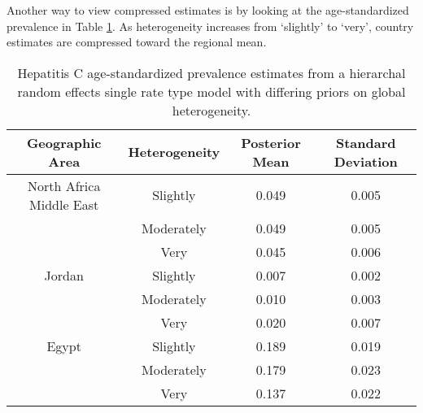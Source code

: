 Another way to view compressed estimates is by looking at the age-standardized prevalence in Table \ref{tab:app-hepc global rfx}.  As heterogeneity increases from `slightly' to `very', country estimates are compressed toward the regional mean.

    \begin{table}[h]
        \begin{center}
        \caption{ Hepatitis C age-standardized prevalence estimates from a hierarchal random effects single rate type model with differing priors on global heterogeneity.}
        \label{tab:app-hepc global rfx}
        \begin{tabular}{|c|c|c|c|}
            \hline
                Geographic Area & Heterogeneity & Posterior Mean & Standard Deviation \\
            \hline
                North Africa Middle East & Slightly & 0.049 & 0.005 \\
                & Moderately & 0.049 & 0.005 \\
                & Very & 0.045 & 0.006 \\
            \hline
                Jordan & Slightly & 0.007 & 0.002 \\
                & Moderately & 0.010 & 0.003 \\
                & Very & 0.020 & 0.007 \\
            \hline
                Egypt & Slightly & 0.189 & 0.019 \\
                & Moderately & 0.179 & 0.023 \\
                & Very & 0.137 & 0.022 \\
            \hline
        \end{tabular}
        \end{center}
    \end{table}
